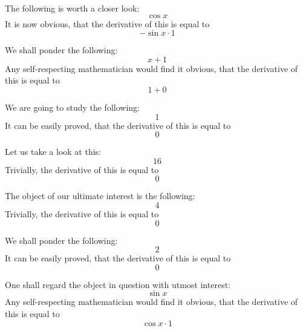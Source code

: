 \documentclass{article}
\begin{document}
The following is worth a closer look:
\begin{equation}
\cos x 
\end{equation}
It is now obvious, that the derivative of this is equal to
\begin{equation}
-\sin x \cdot 1 
\end{equation}

We shall ponder the following:
\begin{equation}
x + 1 
\end{equation}
Any self-respecting mathematician would find it obvious, that the derivative of this is equal to
\begin{equation}
1 + 0 
\end{equation}

We are going to study the following:
\begin{equation}
1 
\end{equation}
It can be easily proved, that the derivative of this is equal to
\begin{equation}
0 
\end{equation}

Let us take a look at this:
\begin{equation}
16 
\end{equation}
Trivially, the derivative of this is equal to
\begin{equation}
0 
\end{equation}

The object of our ultimate interest is the following:
\begin{equation}
4 
\end{equation}
Trivially, the derivative of this is equal to
\begin{equation}
0 
\end{equation}

We shall ponder the following:
\begin{equation}
2 
\end{equation}
It can be easily proved, that the derivative of this is equal to
\begin{equation}
0 
\end{equation}

One shall regard the object in question with utmost interest:
\begin{equation}
\sin x 
\end{equation}
Any self-respecting mathematician would find it obvious, that the derivative of this is equal to
\begin{equation}
\cos x \cdot 1 
\end{equation}
\end{document}
